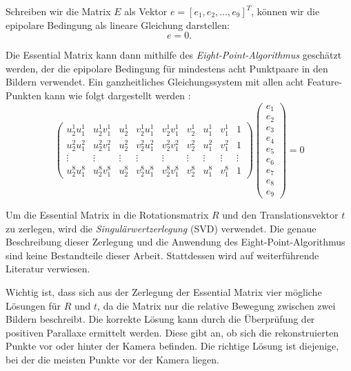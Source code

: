 Schreiben wir die Matrix \( E \) als Vektor \( e = [e_1, e_2, \ldots, e_9]^T \), können wir die epipolare Bedingung als lineare Gleichung darstellen:
\begin{equation}
    [u_2u_1, u_2v_1, u_2, v_2u_1, v_2v_1, v_2, u_1, v_1, 1] e = 0.
\end{equation}

Die Essential Matrix kann dann mithilfe des \emph{Eight-Point-Algorithmus} geschätzt werden, der die epipolare Bedingung für mindestens acht Punktpaare in den Bildern verwendet. Ein ganzheitliches Gleichungssystem mit allen acht Feature-Punkten kann wie folgt dargestellt werden \cite{gao2021vSLAM, stachniss2020FandEmatrix, hartley1997eightpoint}:
\begin{equation}
    \begin{pmatrix}
        u_2^1 u_1^1 & u_2^1 v_1^1 & u_2^1 & v_2^1 u_1^1 & v_2^1 v_1^1 & v_2^1 & u_1^1 & v_1^1 & 1 \\
        u_2^2 u_1^2 & u_2^2 v_1^2 & u_2^2 & v_2^2 u_1^2 & v_2^2 v_1^2 & v_2^2 & u_1^2 & v_1^2 & 1 \\
        \vdots & \vdots & \vdots & \vdots & \vdots & \vdots & \vdots & \vdots & \vdots \\
        u_2^8 u_1^8 & u_2^8 v_1^8 & u_2^8 & v_2^8 u_1^8 & v_2^8 v_1^8 & v_2^8 & u_1^8 & v_1^8 & 1 
    \end{pmatrix}
    \begin{pmatrix}
        e_1 \\ e_2 \\ e_3 \\ e_4 \\ e_5 \\ e_6 \\ e_7 \\ e_8 \\ e_9
    \end{pmatrix}
    = 0
\end{equation}

Um die Essential Matrix in die Rotationsmatrix \( R \) und den Translationsvektor \( t \) zu zerlegen, wird die \emph{Singulärwertzerlegung} (SVD) verwendet. Die genaue Beschreibung dieser Zerlegung und die Anwendung des Eight-Point-Algorithmus sind keine Bestandteile dieser Arbeit. Stattdessen wird auf weiterführende Literatur verwiesen. \cite{gao2021vSLAM, tsai1984svd, hartley1997eightpoint}

Wichtig ist, dass sich aus der Zerlegung der Essential Matrix vier mögliche Lösungen für \( R \) und \( t \), da die Matrix nur die relative Bewegung zwischen zwei Bildern beschreibt. Die korrekte Lösung kann durch die Überprüfung der positiven Parallaxe ermittelt werden. Diese gibt an, ob sich die rekonstruierten Punkte vor oder hinter der Kamera befinden. Die richtige Lösung ist diejenige, bei der die meisten Punkte vor der Kamera liegen. \cite{gao2021vSLAM}

